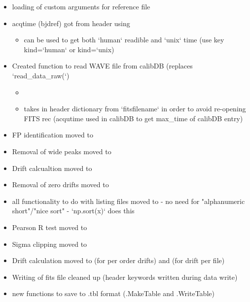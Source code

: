 \begin{itemize}
\item loading of custom arguments for reference file

\item acqtime (bjdref) got from header using 
	\begin{itemize}
	\item can be used to get both `human` readible and `unix` time (use key kind=`human` or kind=`unix)
	\end{itemize}

\item Created function to read WAVE file from calibDB (replaces `read\_data\_raw(`)
	\begin{itemize}
	\item {}
	\item takes in header dictionary from `fitsfilename` in order to avoid re-opening FITS rec (acqutime used in calibDB to get max\_time of calibDB entry) 
	\end{itemize}

\item FP identification moved to 

\item Removal of wide peaks moved to 

\item Drift calcualtion moved to 

\item Removal of zero drifts moved to 

\item all functionality to do with listing files moved to  - no need for "alphanumeric short"/"nice sort" - `np.sort(x)` does this
    
\item Pearson R test moved to 

\item Sigma clipping moved to 

\item Drift calculation moved to  (for per order drifts) and  (for drift per file)

\item Writing of fits file cleaned up (header keywords written during data write)

\item new functions to save to .tbl format (\spirouImage.MakeTable and \spirouImage.WriteTable)

\end{itemize}